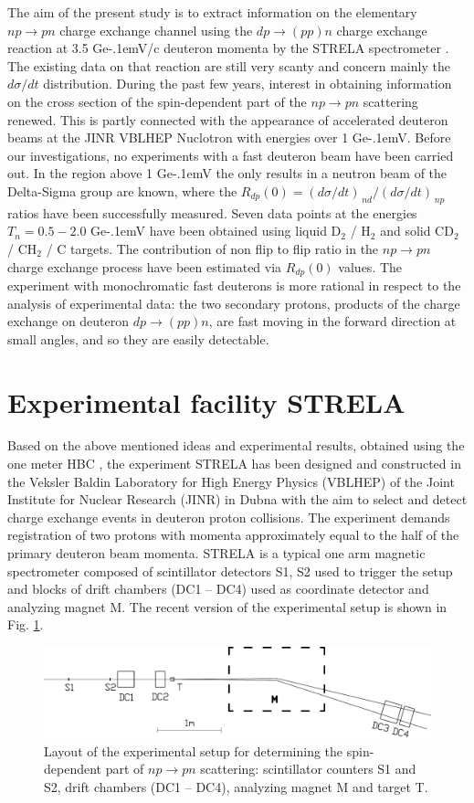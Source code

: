 \documentclass[twocolumn,epjc3]{svjour3}
\newcommand{\np}     {\ensuremath{np \rightarrow pn}\xspace}
\newcommand{\dpchex} {\ensuremath{dp \rightarrow (pp)n}\xspace}
\newcommand{\GeVc}   {Ge\kern-.1emV/c\xspace}
\newcommand{\GeV}    {Ge\kern-.1emV\xspace}
\begin{document}
The aim of the present study is to extract information on the elementary \np
charge exchange channel using the \dpchex charge exchange reaction at 3.5 \GeVc
deuteron momenta by the STRELA spectrometer \cite{gla13}. The existing data on
that reaction are still very scanty and concern mainly the $d\sigma/dt$
distribution. During the past few years, interest in obtaining information on
the cross section of the spin-dependent part of the \np scattering renewed. This
is partly connected with the appearance of accelerated deuteron beams at the
JINR VBLHEP Nuclotron with energies over 1 \GeV. Before our investigations, no
experiments with a fast deuteron beam have been carried out. In the region above
1 \GeV the only results in a neutron beam of the Delta-Sigma group
\cite{sha09,sha09_2,shi11} are known, where the
$R_{dp}(0) = (d\sigma/dt)_{\,nd} / (d\sigma/dt)_{\,np}$ ratios have been
successfully measured. Seven data points at the energies $T_n = 0.5 - 2.0$ \GeV
have been obtained using liquid D$_2$ / H$_2$ and solid CD$_2$ / CH$_2$ / C
targets. The contribution of non flip to flip ratio in the \np charge exchange
process have been estimated via $R_{dp}(0)$ values. The experiment with
monochromatic fast deuterons is more rational in respect to the analysis of
experimental data: the two secondary protons, products of the charge exchange on
deuteron \dpchex, are fast moving in the forward direction at small angles, and
so they are easily detectable.

\section{Experimental facility STRELA}
Based on the above mentioned ideas and experimental results, obtained using the
one meter HBC \cite{gla02,gla08}, the experiment STRELA has been designed and
constructed in the Veksler Baldin Laboratory for High Energy Physics (VBLHEP) of
the Joint Institute for Nuclear Research (JINR) in Dubna with the aim to select
and detect charge exchange events in deuteron proton collisions. The experiment
demands registration of two protons with momenta approximately equal to the half
of the primary deuteron beam momenta. STRELA is a typical one arm magnetic
spectrometer composed of scintillator detectors S1, S2 used to trigger the setup
and blocks of drift chambers (DC1 -- DC4) used as coordinate detector and
analyzing magnet M. The recent version of the experimental setup is shown in
Fig. \ref{fig:STRELA_layout}.

\begin{figure}[t] %
  \centering
  \includegraphics[width=1.00\textwidth]{STRELA_layout.pdf}
  \caption{Layout of the experimental setup for determining the spin-dependent
    part of \np scattering: scintillator counters S1 and S2, drift chambers (DC1
    -- DC4), analyzing magnet M and target T.}
  \label{fig:STRELA_layout}
\end{figure}
\end{document}
